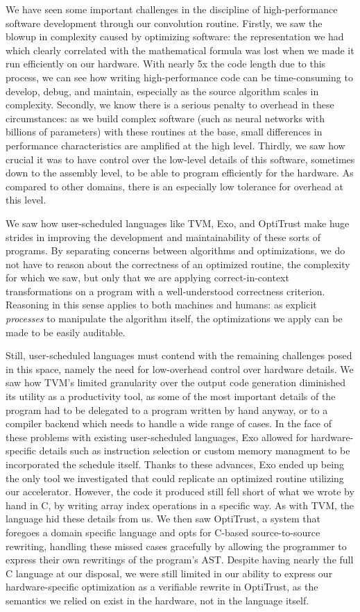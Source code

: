 \documentclass[acmsmall, nonacm=true]{acmart}
\begin{document}
We have seen some important challenges in the discipline of high-performance software development through our convolution routine. Firstly, we saw the blowup in complexity caused by optimizing software: the representation we had which clearly correlated with the mathematical formula was lost when we made it run efficiently on our hardware. With nearly 5x the code length due to this process, we can see how writing high-performance code can be time-consuming to develop, debug, and maintain, especially as the source algorithm scales in complexity. Secondly, we know there is a serious penalty to overhead in these circumstances: as we build complex software (such as neural networks with billions of parameters) with these routines at the base, small differences in performance characteristics are amplified at the high level. Thirdly, we saw how crucial it was to have control over the low-level details of this software, sometimes down to the assembly level, to be able to program efficiently for the hardware. As compared to other domains, there is an especially low tolerance for overhead at this level.

We saw how user-scheduled languages like TVM, Exo, and OptiTrust make huge strides in improving the development and maintainability of these sorts of programs. By separating concerns between algorithms and optimizations, we do not have to reason about the correctness of an optimized routine, the complexity for which we saw, but only that we are applying correct-in-context transformations on a program with a well-understood correctness criterion. Reasoning in this sense applies to both machines and humans: as explicit \textit{processes} to manipulate the algorithm itself, the optimizations we apply can be made to be easily auditable. 

Still, user-scheduled languages must contend with the remaining challenges posed in this space, namely the need for low-overhead control over hardware details. We saw how TVM's limited granularity over the output code generation diminished its utility as a productivity tool, as some of the most important details of the program had to be delegated to a program written by hand anyway, or to a compiler backend which needs to handle a wide range of cases. In the face of these problems with existing user-scheduled languages, Exo allowed for hardware-specific details such as instruction selection or custom memory managment to be incorporated the schedule itself.  Thanks to these advances, Exo ended up being the only tool we investigated that could replicate an optimized routine utilizing our accelerator. However, the code it produced still fell short of what we wrote by hand in C, by writing array index operations in a specific way. As with TVM, the language hid these details from us. We then saw OptiTrust, a system that foregoes a domain specific language and opts for C-based source-to-source rewriting, handling these missed cases gracefully by allowing the programmer to express their own rewritings of the program's AST. Despite having nearly the full C language at our disposal, we were still limited in our ability to express our hardware-specific optimization as a verifiable rewrite in OptiTrust, as the semantics we relied on exist in the hardware, not in the language itself.
\end{document}
